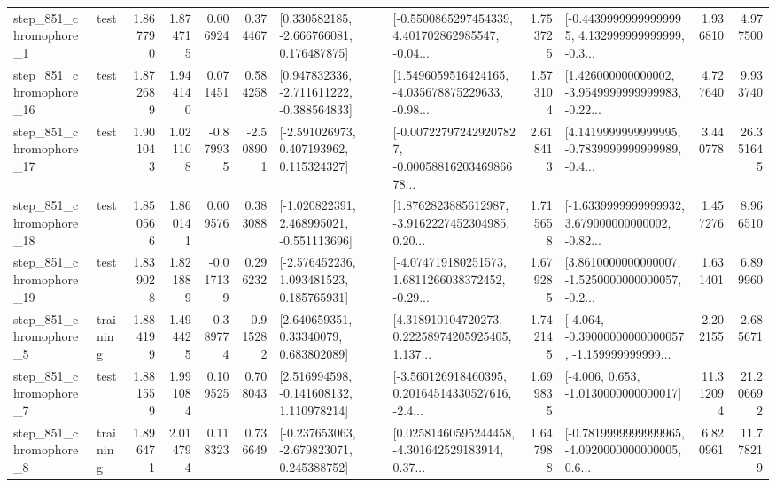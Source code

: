 \begin{tabular}{llrrrrllrlrr}
   step\_851\_chromophore\_1 &      test &      1.867790 &    1.874715 &      0.006924 &  0.374467 &    [0.330582185, -2.666766081, 0.176487875] &  [-0.5500865297454339, 4.401702862985547, -0.04... &       1.753725 &  [-0.44399999999999995, 4.132999999999999, -0.3... &            1.936810 &          4.977500 \\
  step\_851\_chromophore\_16 &      test &      1.872689 &    1.944140 &      0.071451 &  0.584258 &   [0.947832336, -2.711611222, -0.388564833] &  [1.5496059516424165, -4.035678875229633, -0.98... &       1.573104 &  [1.426000000000002, -3.9549999999999983, -0.22... &            4.727640 &          9.933740 \\
  step\_851\_chromophore\_17 &      test &      1.901043 &    1.021108 &     -0.879935 & -2.508901 &    [-2.591026973, 0.407193962, 0.115324327] &  [-0.007227972429207827, -0.0005881620346986678... &       2.618413 &  [4.1419999999999995, -0.7839999999999989, -0.4... &            3.440778 &         26.351645 \\
  step\_851\_chromophore\_18 &      test &      1.850566 &    1.860141 &      0.009576 &  0.383088 &   [-1.020822391, 2.468995021, -0.551113696] &  [1.8762823885612987, -3.9162227452304985, 0.20... &       1.715658 &  [-1.6339999999999932, 3.679000000000002, -0.82... &            1.457276 &          8.966510 \\
  step\_851\_chromophore\_19 &      test &      1.839028 &    1.821889 &     -0.017139 &  0.296232 &    [-2.576452236, 1.093481523, 0.185765931] &  [-4.074719180251573, 1.6811266038372452, -0.29... &       1.679285 &  [3.8610000000000007, -1.5250000000000057, -0.2... &            1.631401 &          6.899960 \\
   step\_851\_chromophore\_5 &  training &      1.884199 &    1.494425 &     -0.389774 & -0.915282 &      [2.640659351, 0.33340079, 0.683802089] &  [4.318910104720273, 0.22258974205925405, 1.137... &       1.742145 &  [-4.064, -0.39000000000000057, -1.159999999999... &            2.202155 &          2.685671 \\
   step\_851\_chromophore\_7 &      test &      1.881559 &    1.991084 &      0.109525 &  0.708043 &    [2.516994598, -0.141608132, 1.110978214] &  [-3.560126918460395, 0.20164514330527616, -2.4... &       1.699835 &               [-4.006, 0.653, -1.0130000000000017] &           11.312094 &         21.206692 \\
   step\_851\_chromophore\_8 &  training &      1.896471 &    2.014794 &      0.118323 &  0.736649 &   [-0.237653063, -2.679823071, 0.245388752] &  [0.02581460595244458, -4.301642529183914, 0.37... &       1.647988 &  [-0.7819999999999965, -4.0920000000000005, 0.6... &            6.820961 &         11.778219 \\

\end{tabular}
